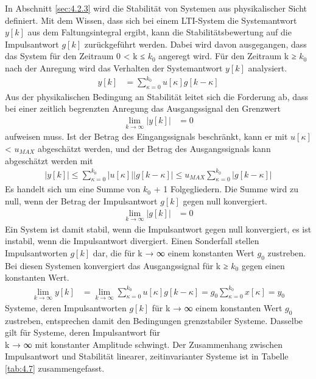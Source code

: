 In Abschnitt \ref{sec:4.2.3} wird die Stabilität von Systemen aus physikalischer Sicht definiert. Mit dem Wissen, dass sich bei einem LTI-System die Systemantwort \(y[k]\) aus dem Faltungsintegral ergibt, kann die Stabilitätsbewertung auf die Impulsantwort \(g[k]\) zurückgeführt werden. Dabei wird davon ausgegangen, dass das System für den Zeitraum 0 \textless{} k ≤ \(k_{0}\) angeregt wird. Für den Zeitraum k ≥ \(k_{0}\) nach der Anregung wird das Verhalten der Systemantwort \(y[k]\) analysiert.
\begin{align}
y[ k] &= \sum\limits_{\kappa = 0}^{k_{0}}{u[\kappa]  g[ k - \kappa]} \label{eq:4.97}
\end{align}
Aus der physikalischen Bedingung an Stabilität leitet sich die Forderung ab, dass bei einer zeitlich begrenzten Anregung das Ausgangssignal den Grenzwert
\begin{align}
\lim_{k \rightarrow \infty}\left| y[ k] \right| &= 0 \label{eq:4.98}
\end{align}
aufweisen muss. Ist der Betrag des Eingangssignals beschränkt, kann er mit \textbar \(u[κ]\)\textbar{} \textless{} \(u_{MAX}\) abgeschätzt werden, und der Betrag des Ausgangssignals kann abgeschätzt werden mit
\begin{align}
\left| y[ k] \right| \leq \sum\limits_{\kappa = 0}^{k_{0}}{\left| u[\kappa] \right|  \left| g[ k - \kappa] \right|} \leq u_{MAX}  \sum\limits_{\kappa = 0}^{k_{0}}\left| g[ k - \kappa] \right| \label{eq:4.99}
\end{align}
Es handelt sich um eine Summe von \(k_{0}\) + 1 Folgegliedern. Die Summe wird zu null, wenn der Betrag der Impulsantwort \(g[k]\) gegen null konvergiert.
\begin{align}
\lim_{k \rightarrow \infty}\left| g[ k] \right| &= 0 \label{eq:4.100}
\end{align}
Ein System ist damit stabil, wenn die Impulsantwort gegen null konvergiert, es ist instabil, wenn die Impulsantwort divergiert. Einen Sonderfall stellen Impulsantworten \(g[k]\) dar, die für k → ∞ einem konstanten Wert \(g_{0}\) zustreben. Bei diesen Systemen konvergiert das Ausgangssignal für k ≥ \(k_{0}\) gegen einen konstanten Wert.
\begin{align}
\lim_{k \rightarrow \infty}y[ k] &= \lim_{k \rightarrow \infty}\sum\limits_{\kappa = 0}^{k_{0}}{u[\kappa]  g[ k - \kappa]} = g_{0}  \sum\limits_{\kappa = 0}^{k_{0}}{x[\kappa]} = y_{0} \label{eq:4.101}
\end{align}
Systeme, deren Impulsantworten \(g[k]\) für k → ∞ einem konstanten Wert \(g_{0}\) zustreben, entsprechen damit den Bedingungen grenzstabiler Systeme. Dasselbe gilt für Systeme, deren Impulsantwort für\\
k → ∞ mit konstanter Amplitude schwingt. Der Zusammenhang zwischen Impulsantwort und Stabilität linearer, zeitinvarianter Systeme ist in Tabelle \ref{tab:4.7} zusammengefasst.

